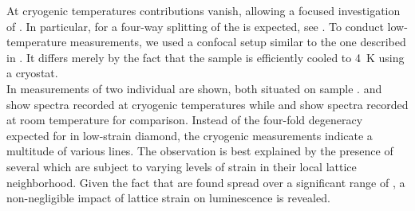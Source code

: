 			At cryogenic temperatures \psb contributions vanish, allowing a focused investigation of \zpls.
			In particular, for \sivs a four-way splitting of the \zpl is expected, see .
			To conduct low-temperature measurements, we used a confocal setup similar to the one described in .
			It differs merely by the fact that the sample is efficiently cooled to \SI{4}{\kelvin} using a cryostat.
			\\
			In  measurements of two individual \nds are shown, both situated on sample \insituSo.
			 and  show spectra recorded at cryogenic temperatures while  and  show spectra recorded at room temperature for comparison.
			Instead of the four-fold degeneracy expected for \sivs in low-strain diamond, the cryogenic measurements indicate a multitude of various lines.
			The observation is best explained by the presence of several \sivs which are subject to varying levels of strain in their local lattice neighborhood.
			Given the fact that \zpls are found spread over a significant range of \wls, a non-negligible impact of lattice strain on \siv luminescence is revealed.
